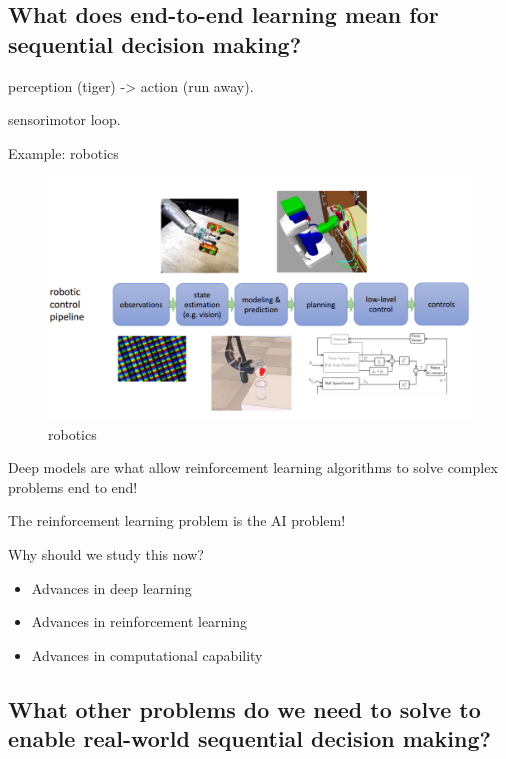 \subsection{What does end-to-end learning mean for sequential decision making?}
perception (tiger) -> action (run away). 

sensorimotor loop.

Example: robotics
\begin{figure}[h!] %
	\centering
	\includegraphics[width=0.8\linewidth]{img/1-robotics.png}
	\caption{robotics}\label{img:1-robotics}
\end{figure}

Deep models are what allow reinforcement
learning algorithms to solve complex problems
end to end!

The reinforcement learning problem is the AI problem!

Why should we study this now?
\begin{itemize}
	\item Advances in deep learning
	\item Advances in reinforcement learning
	\item Advances in computational capability
\end{itemize}


\subsection{What other problems do we need to solve to 
enable real-world sequential decision making?}

